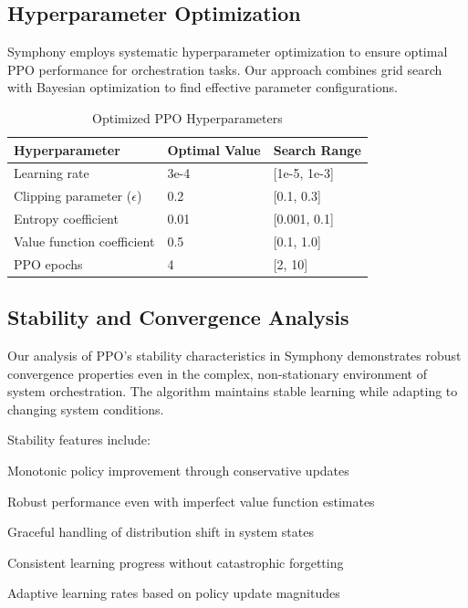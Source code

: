 \subsection*{Hyperparameter Optimization}

Symphony employs systematic hyperparameter optimization to ensure optimal PPO performance for orchestration tasks. Our approach combines grid search with Bayesian optimization to find effective parameter configurations.

\begin{table}[ht]
\centering
\begin{tabular}{@{}lll@{}}
\toprule
\textbf{Hyperparameter} & \textbf{Optimal Value} & \textbf{Search Range} \\
\midrule
Learning rate & 3e-4 & [1e-5, 1e-3] \\
Clipping parameter ($\epsilon$) & 0.2 & [0.1, 0.3] \\
Entropy coefficient & 0.01 & [0.001, 0.1] \\
Value function coefficient & 0.5 & [0.1, 1.0] \\
PPO epochs & 4 & [2, 10] \\
\bottomrule
\end{tabular}
\caption{Optimized PPO Hyperparameters}
\end{table}

\subsection*{Stability and Convergence Analysis}

Our analysis of PPO's stability characteristics in Symphony demonstrates robust convergence properties even in the complex, non-stationary environment of system orchestration. The algorithm maintains stable learning while adapting to changing system conditions.

Stability features include:

\begin{compactlist}
    \item Monotonic policy improvement through conservative updates
    \item Robust performance even with imperfect value function estimates
    \item Graceful handling of distribution shift in system states
    \item Consistent learning progress without catastrophic forgetting
    \item Adaptive learning rates based on policy update magnitudes
\end{compactlist}


